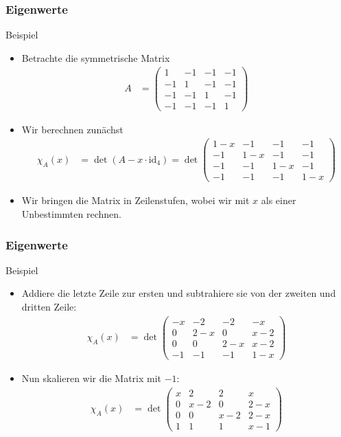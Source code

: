 \documentclass{beamer}
\newcommand{\id}{\mathrm{id}}
\renewcommand{\ae}{\"a}
\newcommand{\mytitle}{Eigenwerte}
\begin{document}
\begin{frame}\frametitle{\mytitle}
	\begin{block}{Beispiel}
	\begin{itemize}
		\item Betrachte die symmetrische Matrix
			\begin{align*}
				A&=\begin{pmatrix}
					1&-1&-1&-1\\-1&1&-1&-1\\-1&-1&1&-1\\-1&-1&-1&1
				\end{pmatrix}
			\end{align*}
		\item Wir berechnen zun\ae chst
			\begin{align*}
				\chi_A(x)&=\det(A-x\cdot\id_4)=\det\begin{pmatrix}
					1-x&-1&-1&-1\\-1&1-x&-1&-1\\-1&-1&1-x&-1\\-1&-1&-1&1-x
				\end{pmatrix}
			\end{align*}
		\item Wir bringen die Matrix in Zeilenstufen, wobei wir mit $x$ als einer \alert{Unbestimmten} rechnen.
	\end{itemize}
	\end{block}
\end{frame}

\begin{frame}\frametitle{\mytitle}
	\begin{block}{Beispiel}
	\begin{itemize}
		\item Addiere die letzte Zeile zur ersten und subtrahiere sie von der zweiten und dritten Zeile:
			\begin{align*}
				\chi_A(x)&=\det\begin{pmatrix}
					-x&-2&-2&-x\\0&2-x&0&x-2\\0&0&2-x&x-2\\-1&-1&-1&1-x
				\end{pmatrix}
			\end{align*}
		\item Nun skalieren wir die Matrix mit $-1$:
\begin{align*}
				\chi_A(x)&=\det\begin{pmatrix}
					x&2&2&x\\0&x-2&0&2-x\\0&0&x-2&2-x\\1&1&1&x-1
				\end{pmatrix}
			\end{align*}
	\end{itemize}
	\end{block}
\end{frame}
\end{document}
